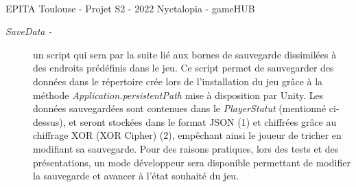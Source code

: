 \vfill
\noindent\makebox[\linewidth]{\rule{.8\paperwidth}{.6pt}}\\[0.2cm]
EPITA Toulouse - Projet S2 - 2022 \hfill Nyctalopia - gameHUB
\noindent\makebox[\linewidth]{\rule{.8\paperwidth}{.6pt}}

\begin{description}
  \item[\emph{SaveData -}] un script qui sera par la suite lié aux bornes de sauvegarde dissimilées à des endroits prédéfinis dans le jeu. Ce script permet de sauvegarder des données dans le répertoire crée lors de l’installation du jeu grâce à la méthode \emph{Application.persistentPath} mise à disposition par Unity. Les données sauvegardées sont contenues dans le \emph{PlayerStatut} (mentionné ci-dessus), et seront stockées dans le format JSON (1) et chiffrées grâce au chiffrage XOR (XOR Cipher) (2), empêchant ainsi le joueur de tricher en modifiant sa sauvegarde. Pour des raisons pratiques, lors des tests et des présentations, un mode développeur sera disponible permettant de modifier la sauvegarde et avancer à l’état souhaité du jeu.
\end{description}

